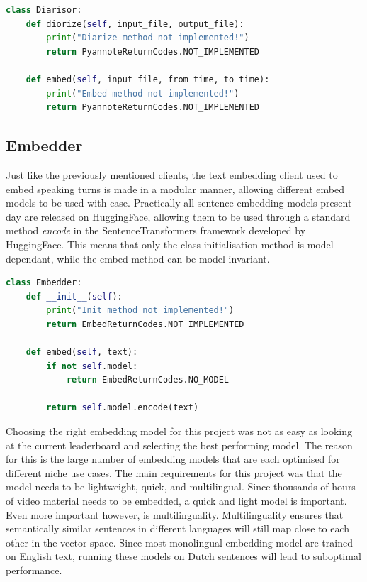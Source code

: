\documentclass[twoside]{uva-inf-bachelor-thesis}
\begin{document}
\begin{lstlisting}[language=Python, caption={Modular speaker diarisation class.}]
class Diarisor:
    def diorize(self, input_file, output_file):
        print("Diarize method not implemented!")
        return PyannoteReturnCodes.NOT_IMPLEMENTED

    def embed(self, input_file, from_time, to_time):
        print("Embed method not implemented!")
        return PyannoteReturnCodes.NOT_IMPLEMENTED
\end{lstlisting}

\subsection{Embedder}
Just like the previously mentioned clients, the text embedding client used to embed speaking turns is made in a modular manner, allowing different embed models to be used with ease. Practically all sentence embedding models present day are released on HuggingFace, allowing them to be used through a standard method \textit{encode} in the SentenceTransformers framework developed by HuggingFace. This means that only the class initialisation method is model dependant, while the embed method can be model invariant.

\begin{lstlisting}[language=Python, caption={Modular embed class.}]
class Embedder:
    def __init__(self):
        print("Init method not implemented!")
        return EmbedReturnCodes.NOT_IMPLEMENTED

    def embed(self, text):
        if not self.model:
            return EmbedReturnCodes.NO_MODEL

        return self.model.encode(text)
\end{lstlisting}

Choosing the right embedding model for this project was not as easy as looking at the current leaderboard and selecting the best performing model. The reason for this is the large number of embedding models that are each optimised for different niche use cases. 
The main requirements for this project was that the model needs to be lightweight, quick, and multilingual. Since thousands of hours of video material needs to be embedded, a quick and light model is important. Even more important however, is multilinguality. Multilinguality ensures that semantically similar sentences in different languages will still map close to each other in the vector space. Since most monolingual embedding model are trained on English text, running these models on Dutch sentences will lead to suboptimal performance.
\end{document}
